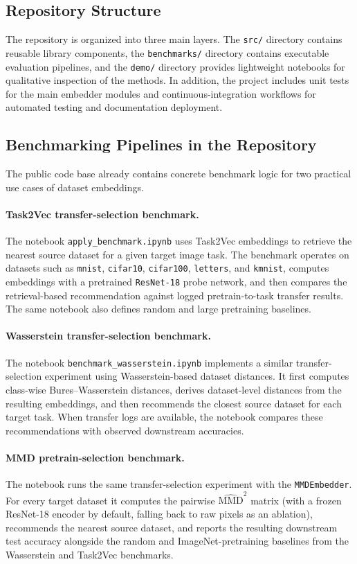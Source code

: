 \documentclass[peerreview]{IEEEtran}
\begin{document}
\subsection{Repository Structure}
The repository is organized into three main layers. The
\texttt{src/} directory contains reusable library components, the
\texttt{benchmarks/} directory contains executable evaluation
pipelines, and the \texttt{demo/} directory provides lightweight
notebooks for qualitative inspection of the methods. In addition, the
project includes unit tests for the main embedder modules and
continuous-integration workflows for automated testing and
documentation deployment.

\subsection{Benchmarking Pipelines in the Repository}
The public code base already contains concrete benchmark logic for
two practical use cases of dataset embeddings.

\paragraph{Task2Vec transfer-selection benchmark.}
The notebook \texttt{apply\_benchmark.ipynb}
uses Task2Vec embeddings to retrieve the nearest source dataset for a
given target image task. The benchmark operates on datasets such as
\texttt{mnist}, \texttt{cifar10}, \texttt{cifar100},
\texttt{letters}, and \texttt{kmnist}, computes embeddings with a
pretrained \texttt{ResNet-18} probe network, and then compares the
retrieval-based recommendation against logged pretrain-to-task
transfer results. The same notebook also defines random and large
pretraining baselines.

\paragraph{Wasserstein transfer-selection benchmark.}
The notebook
\texttt{benchmark\_wasserstein.ipynb}
implements a similar transfer-selection experiment using
Wasserstein-based dataset distances. It first computes class-wise
Bures--Wasserstein distances, derives dataset-level distances from the
resulting embeddings, and then recommends the closest source dataset
for each target task. When transfer logs are available, the notebook
compares these recommendations with observed downstream accuracies.

\paragraph{MMD pretrain-selection benchmark.}
The notebook
runs the same transfer-selection experiment with the
\texttt{MMDEmbedder}. For every target dataset it computes the pairwise
$\widehat{\mathrm{MMD}}^{2}$ matrix (with a frozen ResNet-18 encoder by
default, falling back to raw pixels as an ablation), recommends the
nearest source dataset, and reports the resulting downstream test
accuracy alongside the random and ImageNet-pretraining baselines from
the Wasserstein and Task2Vec benchmarks.
\end{document}
